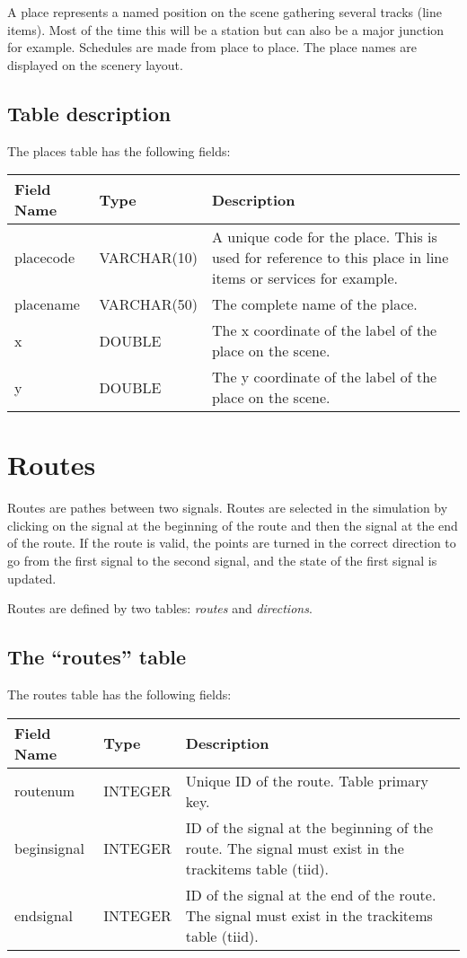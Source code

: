 \documentclass[12pt,a4paper]{article}
\begin{document}
A place represents a named position on the scene gathering several tracks (line items). Most of the time this will be a station but can also be a major junction for example. Schedules are made from place to place. The place names are displayed on the scenery layout.

\subsection{Table description}
The places table has the following fields:
\begin{center}
\begin{tabular}{|l|l|p{10cm}|}
\hline
\textbf{Field Name}&\textbf{Type}&\textbf{Description}\\
\hline
placecode&VARCHAR(10)&A unique code for the place. This is used for reference to this place in line items or services for example. \\
\hline
placename&VARCHAR(50)&The complete name of the place. \\
\hline
x&DOUBLE&The x coordinate of the label of the place on the scene. \\
\hline
y&DOUBLE&The y coordinate of the label of the place on the scene. \\
\hline
\end{tabular}
\end{center}

\section{Routes}

Routes are pathes between two signals. Routes are selected in the simulation by clicking on the signal at the beginning of the route and then the signal at the end of the route. If the route is valid, the points are turned in the correct direction to go from the first signal to the second signal, and the state of the first signal is updated.

Routes are defined by two tables: \textit{routes} and \textit{directions}.

\subsection{The ``routes'' table}
The routes table has the following fields:
\begin{center}
\begin{tabular}{|l|l|p{10cm}|}
\hline
\textbf{Field Name}&\textbf{Type}&\textbf{Description}\\
\hline
routenum&INTEGER&Unique ID of the route. Table primary key.\\
\hline
beginsignal&INTEGER&ID of the signal at the beginning of the route. The signal must exist in the trackitems table (tiid).\\
\hline
endsignal&INTEGER&ID of the signal at the end of the route. The signal must exist in the trackitems table (tiid).\\
\hline
\end{tabular}
\end{center}
\end{document}
